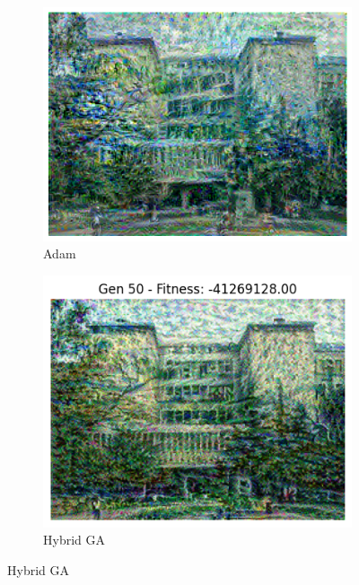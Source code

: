 \documentclass[a4paper,12pt]{article}
\begin{document}
\begin{figure}[H]
\begin{subfigure}{0.4\textwidth}
    \centering
    \includegraphics[width=\linewidth]{matf_adam.png}
    \caption{Adam}
\end{subfigure}
\hfill
\begin{subfigure}{0.4\textwidth}
    \centering
    \includegraphics[width=\linewidth]{matf_ga.png}
    \caption{Hybrid GA}
\end{subfigure}
\end{figure}
\end{document}
